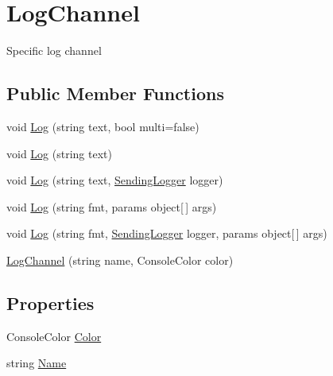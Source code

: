 \hypertarget{classOTA_1_1Logging_1_1LogChannel}{}\section{Log\+Channel}
\label{classOTA_1_1Logging_1_1LogChannel}


Specific log channel  


\subsection*{Public Member Functions}
\begin{DoxyCompactItemize}
\item 
void \hyperlink{classOTA_1_1Logging_1_1LogChannel_ac371023446b7e323ef48875e18f88375}{Log} (string text, bool multi=false)
\item 
void \hyperlink{classOTA_1_1Logging_1_1LogChannel_abeced7f9db890f4308350ecd4566d17e}{Log} (string text)
\item 
void \hyperlink{classOTA_1_1Logging_1_1LogChannel_a2935156186f4ee48ce691d3b63bef23b}{Log} (string text, \hyperlink{namespaceOTA_1_1Logging_a489c780cb72d9452216c06b7a0eec2a6}{Sending\+Logger} logger)
\item 
void \hyperlink{classOTA_1_1Logging_1_1LogChannel_a7051e3ff3dafd3800c5270d84525b7bc}{Log} (string fmt, params object\mbox{[}$\,$\mbox{]} args)
\item 
void \hyperlink{classOTA_1_1Logging_1_1LogChannel_a895ee633604382fc61fa6691f5238686}{Log} (string fmt, \hyperlink{namespaceOTA_1_1Logging_a489c780cb72d9452216c06b7a0eec2a6}{Sending\+Logger} logger, params object\mbox{[}$\,$\mbox{]} args)
\item 
\hyperlink{classOTA_1_1Logging_1_1LogChannel_a9b1141cf5051b1dc2e9103dc9ce040db}{Log\+Channel} (string name, Console\+Color color)
\end{DoxyCompactItemize}
\subsection*{Properties}
\begin{DoxyCompactItemize}
\item 
Console\+Color \hyperlink{classOTA_1_1Logging_1_1LogChannel_ad2c93089db393e5335ef195d21fec9a7}{Color}
\item 
string \hyperlink{classOTA_1_1Logging_1_1LogChannel_a7ee9065718e6628dc7791b756fa6c0f9}{Name}
\end{DoxyCompactItemize}


